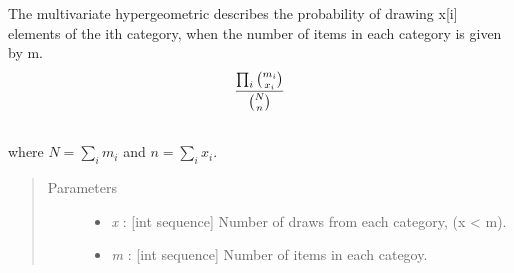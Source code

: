 \documentclass[letterpaper,10pt,english]{sphinxmanual}
\begin{document}
\begin{fulllineitems}
\label{distributions:pymc.distributions.multivariate_hypergeometric_like}
The multivariate hypergeometric describes the probability of drawing x{[}i{]}
elements of the ith category, when the number of items in each category is
given by m.
\begin{gather}
\begin{split}\frac{\prod_i \binom{m_i}{x_i}}{\binom{N}{n}}\end{split}\notag\\\begin{split}\end{split}\notag
\end{gather}
where $N = \sum_i m_i$ and $n = \sum_i x_i$.
\begin{quote}\begin{description}
\item[{Parameters }] \leavevmode\begin{itemize}
\item {} 
\emph{x} : {[}int sequence{]} Number of draws from each category, (x \textless{} m).

\item {} 
\emph{m} : {[}int sequence{]} Number of items in each categoy.

\end{itemize}

\end{description}\end{quote}

\end{fulllineitems}

\end{document}
